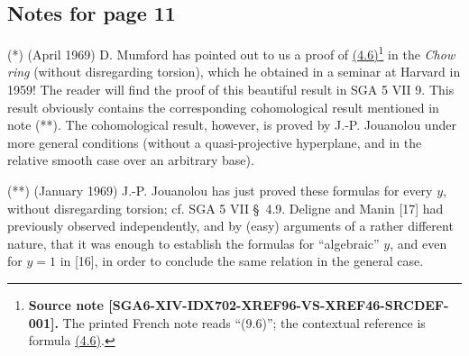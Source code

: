 \subsection*{Notes for page 11}

\noindent(*) (April 1969) D. Mumford has pointed out to us a proof of
\hyperlink{sga6.e14.para.4-6}{(4.6)}\footnote{\textbf{Source note
[SGA6-XIV-IDX702-XREF96-VS-XREF46-SRCDEF-001].} The printed French note
reads ``(9.6)''; the contextual reference is formula \hyperlink{sga6.e14.eq.4-6}{(4.6)}.}
in the \emph{Chow ring} (without disregarding torsion), which he obtained in
a seminar at Harvard in 1959! The reader will find the proof of this
beautiful result in SGA 5 VII 9. This result obviously contains the
corresponding cohomological result mentioned in note (**). The cohomological
result, however, is proved by J.-P. Jouanolou under more general conditions
(without a quasi-projective hyperplane, and in the relative smooth case over
an arbitrary base).

\medskip

\noindent(**) (January 1969) J.-P. Jouanolou has just proved these formulas
for every $y$, without disregarding torsion; cf. SGA 5 VII \S~4.9. Deligne
and Manin [17] had previously observed independently, and by (easy)
arguments of a rather different nature, that it was enough to establish the
formulas for ``algebraic'' $y$, and even for $y=1$ in [16], in order to
conclude the same relation in the general case.

